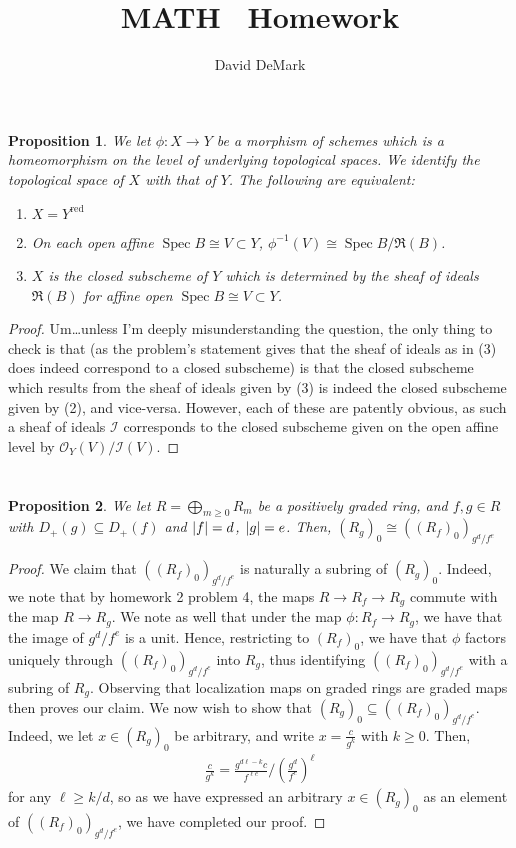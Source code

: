 \documentclass[english,letter,doublesided]{article}
\title{MATH \course~Homework \Roman{hwn}}
\author{David DeMark}
\date{\due}
\DeclareMathOperator{\spec}{Spec}
\DeclarePairedDelimiter\abs{\lvert}{\rvert}%
\newcommand{\OO}{\mathcal{O}}
\newcommand{\Ical}{\mathcal{I}}
\newcommand{\prob}[1]{\setcounter{section}{#1-1}\section{}}
\newtheorem*{prop*}{Proposition}
\theoremstyle{remark}
\theoremstyle{definition}
\newcommand{\red}{\mathrm{red}}
\newcommand{\Rfr}{\mathfrak{R}}
\begin{document}
\maketitle
\prob{1}\begin{prop*}
	We let $\phi:X\to Y$ be a morphism of schemes which is a homeomorphism on the level of underlying topological spaces. We identify the topological space of $X$ with that of $Y$.  The following are equivalent:
	\begin{enumerate}[label=(\arabic*)]
		\item $X=Y^\red$
		\item On each open affine $\spec B\cong V\subset Y$, $\phi^{-1}(V)\cong \spec B/\Rfr(B)$.
		\item $X$ is the closed subscheme of $Y$ which is determined by the sheaf of ideals $\Rfr(B)$ for affine open $\spec B\cong V\subset Y$.
	\end{enumerate}
\end{prop*}
\begin{proof}
	Um\dots unless I'm deeply misunderstanding the question, the only thing to check is that (as the problem's statement gives that the sheaf of ideals as in (3) does indeed correspond to a closed subscheme) is that the closed subscheme which results from the sheaf of ideals given by (3) is indeed the closed subscheme given by (2), and vice-versa. However, each of these are patently obvious, as such a sheaf of ideals $\Ical$ corresponds to the closed subscheme given on the open affine level by $\OO_Y(V)/\Ical(V)$.
\end{proof}
\prob{2}
\begin{prop*}
	We let $R=\bigoplus_{m\geq 0} R_m$ be a positively graded ring, and $f,g\in R$ with $D_+(g)\subseteq D_+(f)$ and $\abs{f}=d$, $\abs{g}=e$. Then, $(R_g)_0\cong ((R_f)_0)_{g^d/f^e}$
\end{prop*}
\begin{proof}
We claim that $((R_f)_0)_{g^d/f^e}$ is naturally a subring of $(R_g)_0$. Indeed, we note that by homework 2 problem 4, the maps $R\to R_f\to R_g$ commute with the map $R\to R_g$. We note as well that under the map $ \phi: R_f\to R_g$, we have that the image of $g^d/f^e$ is a unit. Hence, restricting to $(R_f)_0$, we have that $\phi$ factors uniquely through $((R_f)_0)_{g^d/f^e}$ into $R_g$, thus identifying $((R_f)_0)_{g^d/f^e}$ with a subring of $R_g$. Observing that localization maps on graded rings are graded maps then proves our claim. We now wish to show that $(R_g)_0\subseteq ((R_f)_0)_{g^d/f^e}$. Indeed, we let $x\in (R_g)_0$ be arbitrary, and write $x=\frac{c}{g^k}$ with $k\geq 0$. Then, \begin{align*}
	\frac{c}{g^k}=\frac{g^{d\ell-k}c}{f^{\ell e}}/\left(\frac{g^d}{f^e}\right)^\ell
\end{align*} for any $\ell\geq k/d$, so as we have expressed an arbitrary $x\in (R_g)_0$ as an element of $((R_f)_0)_{g^d/f^e}$, we have completed our proof. 
\end{proof}
\end{document}
